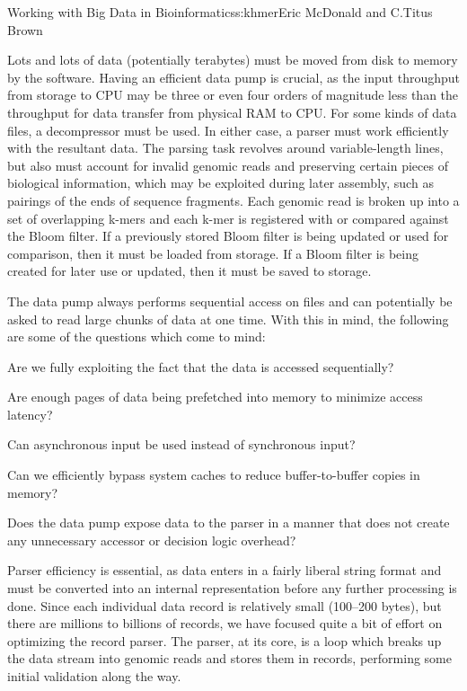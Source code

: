 \begin{aosachapter}{Working with Big Data in Bioinformatics}{s:khmer}{Eric McDonald and C.\/Titus Brown}

Lots and lots of data (potentially terabytes) must be moved from disk to
memory by the software. Having an efficient data pump is crucial, as the
input throughput from storage to CPU may be three or even four orders of
magnitude less than the throughput for data transfer from physical RAM
to CPU. For some kinds of data files, a decompressor must be used. In
either case, a parser must work efficiently with the resultant data. The
parsing task revolves around variable-length lines, but also must
account for invalid genomic reads and preserving certain pieces of
biological information, which may be exploited during later assembly,
such as pairings of the ends of sequence fragments. Each genomic read is
broken up into a set of overlapping k-mers and each k-mer is registered
with or compared against the Bloom filter. If a previously stored Bloom
filter is being updated or used for comparison, then it must be loaded
from storage. If a Bloom filter is being created for later use or
updated, then it must be saved to storage.

The data pump always performs sequential access on files and can
potentially be asked to read large chunks of data at one time. With this
in mind, the following are some of the questions which come to mind:

\begin{aosaitemize}
\item
  Are we fully exploiting the fact that the data is accessed
  sequentially?
\item
  Are enough pages of data being prefetched into memory to minimize
  access latency?
\item
  Can asynchronous input be used instead of synchronous input?
\item
  Can we efficiently bypass system caches to reduce buffer-to-buffer
  copies in memory?
\item
  Does the data pump expose data to the parser in a manner that does not
  create any unnecessary accessor or decision logic overhead?
\end{aosaitemize}

Parser efficiency is essential, as data enters in a fairly liberal
string format and must be converted into an internal representation
before any further processing is done. Since each individual data record
is relatively small (100--200 bytes), but there are millions to billions
of records, we have focused quite a bit of effort on optimizing the
record parser. The parser, at its core, is a loop which breaks up the
data stream into genomic reads and stores them in records, performing
some initial validation along the way.


\end{aosachapter}
